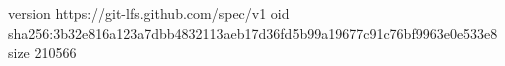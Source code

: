 version https://git-lfs.github.com/spec/v1
oid sha256:3b32e816a123a7dbb4832113aeb17d36fd5b99a19677c91c76bf9963e0e533e8
size 210566
